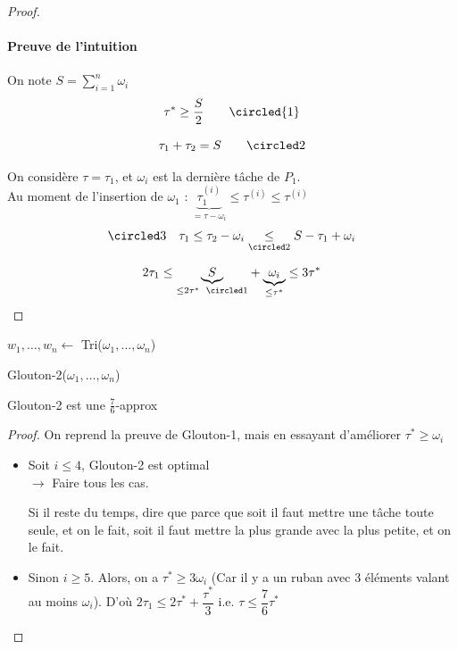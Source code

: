 \begin{proof}
	\paragraph{Preuve de l'intuition} On note $S = \sum\limits_{i = 1}^n \omega_i$
	$$\tau^* \geq \dfrac{S}{2} \qquad \circled{1}$$
	
	$$\tau_1 + \tau_2 = S \qquad \circled 2$$
	
	On considère $\tau = \tau_1$, et $\omega_i$ est la dernière tâche de $P_1$.\\
	Au moment de l'insertion de $\omega_1$ : $\underset{= \tau - \omega_i}{\underbrace{\tau_1^{(i)}}} \leq \tau^{(i)} \leq \tau^{(i)} $ \quad {}\\
	
	$$\circled 3 \quad \tau_1 \leq \tau_2 - \omega_i \underset{\circled 2}{\leq} S - \tau_1 + \omega_i$$
	
	$$ 2\tau_1 \leq \underset{\leq 2\tau^* \enspace \circled 1}{\underbrace{S}} + \underset{\leq \tau^*}{\underbrace{\omega_i}} \leq 3\tau^* $$
	
\end{proof}

\begin{algorithm}[H]
	$w_1, \dots, w_n \leftarrow$ Tri($\omega_1, \dots, \omega_n$)\\
\caption{Glouton-2($\omega_1, \dots, \omega_n$)}
\end{algorithm}

\begin{theorem}
	Glouton-2 est une $\frac{7}{6}$-approx
\end{theorem}

\begin{proof}
	On reprend la preuve de Glouton-1, mais en essayant d'améliorer $\tau^* \geq \omega_i$
	\begin{itemize}[label=$\star$]
		\item Soit $i \leq 4$, Glouton-2 est optimal\\
		$\to$ Faire tous les cas.\begin{com}
			Si il reste du temps, dire que parce que soit il faut mettre une tâche toute seule, et on le fait, soit il faut mettre la plus grande avec la plus petite, et on le fait.
		\end{com}
		\item Sinon $i \geq 5$. Alors, on a $\tau^* \geq 3 \omega_i$ (Car il y a un ruban avec 3 éléments valant au moins $\omega_i$). D'où $2\tau_1 \leq 2\tau^* + \dfrac{\tau^*}{3}$ i.e. $\tau \leq \dfrac{7}{6}\tau^*$
	\end{itemize}
\end{proof}

